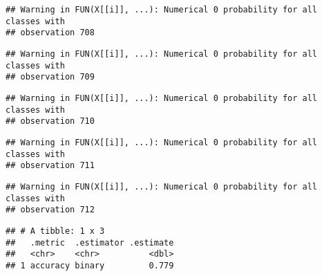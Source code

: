 \documentclass[
]{article}
\begin{document}
\begin{verbatim}
## Warning in FUN(X[[i]], ...): Numerical 0 probability for all classes with
## observation 708
\end{verbatim}

\begin{verbatim}
## Warning in FUN(X[[i]], ...): Numerical 0 probability for all classes with
## observation 709
\end{verbatim}

\begin{verbatim}
## Warning in FUN(X[[i]], ...): Numerical 0 probability for all classes with
## observation 710
\end{verbatim}

\begin{verbatim}
## Warning in FUN(X[[i]], ...): Numerical 0 probability for all classes with
## observation 711
\end{verbatim}

\begin{verbatim}
## Warning in FUN(X[[i]], ...): Numerical 0 probability for all classes with
## observation 712
\end{verbatim}

\begin{verbatim}
## # A tibble: 1 x 3
##   .metric  .estimator .estimate
##   <chr>    <chr>          <dbl>
## 1 accuracy binary         0.779
\end{verbatim}
\end{document}
